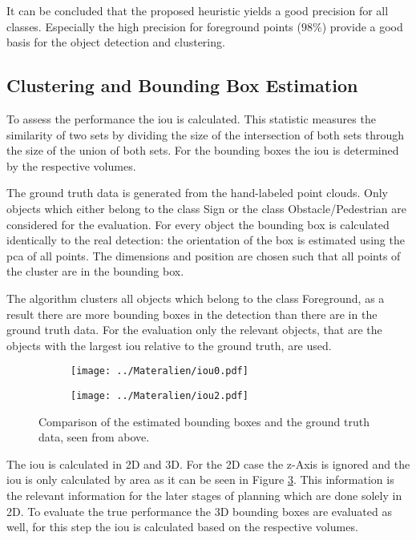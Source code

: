 It can be concluded that the proposed heuristic yields a good precision for all classes. 
Especially the high precision for foreground points ($98\%$) provide a good basis for the object detection and clustering.

\subsection{Clustering and Bounding Box Estimation} \label{sec:eval:iou}
To assess the performance the \ac{iou} is calculated. 
This statistic measures the similarity of two sets by dividing the size of the intersection of both sets through the size of the union of both sets. 
For the bounding boxes the \ac{iou} is determined by the respective volumes.

The ground truth data is generated from the hand-labeled point clouds. Only objects which either belong to the class Sign or the class Obstacle/Pedestrian are considered for the evaluation.
For every object the bounding box is calculated identically to the real detection: the orientation of the box is estimated using the \ac{pca} of all points. The dimensions and
position are chosen such that all points of the cluster are in the bounding box.

The algorithm clusters all objects which belong to the class Foreground, as a result there are more bounding boxes in the detection than there are in the ground truth data.
For the evaluation only the relevant objects, that are the objects with the largest \ac{iou} relative to the ground truth, are used.

\begin{figure}[h!]
    \centering
    \begin{subfigure}[c]{0.75\textwidth}
        \texttt{[image: ../Materalien/iou0.pdf]}
        \subcaption{}
        \label{fig:eval:iou:0}
    \end{subfigure}

    \begin{subfigure}[c]{0.75\textwidth}
        \texttt{[image: ../Materalien/iou2.pdf]}
        \subcaption{}
        \label{fig:eval:iou:2}
    \end{subfigure}
    \caption{Comparison of the estimated bounding boxes and the ground truth data, seen from above.}
    \label{fig:eval:iou}
\end{figure}

The \ac{iou} is calculated in 2D and 3D. For the 2D case the z-Axis is ignored and the \ac{iou} is only calculated by area as it can be seen in Figure \ref{fig:eval:iou}.
This information is the relevant information for the later stages of planning which are done solely in 2D. To evaluate the true performance the 3D bounding boxes are evaluated as well,
for this step the \ac{iou} is calculated based on the respective volumes.

